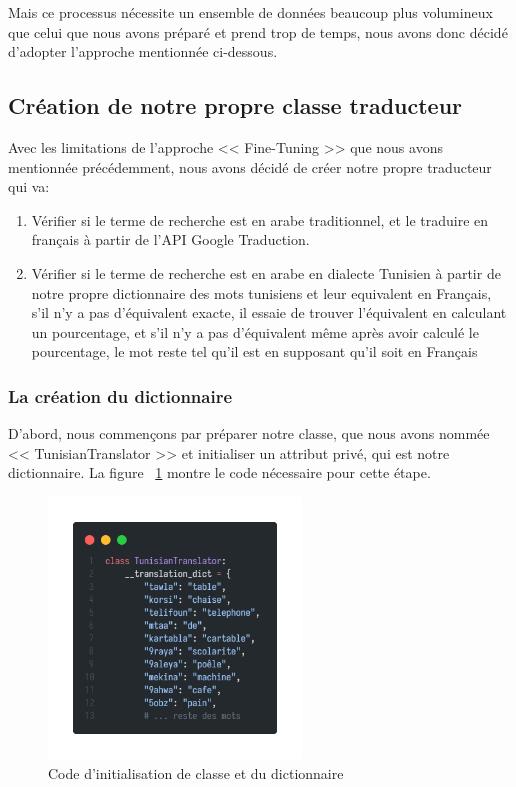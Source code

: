 \noindent
Mais ce processus nécessite un ensemble de données beaucoup plus volumineux que celui que nous avons préparé et prend trop de temps, nous avons donc décidé d'adopter l'approche mentionnée ci-dessous.

\newpage
\subsection{Création de notre propre classe traducteur}
\noindent
Avec les limitations de l'approche << Fine-Tuning >> que nous avons mentionnée précédemment, nous avons décidé de créer notre propre traducteur qui va:
\begin{enumerate}
	\item Vérifier si le terme de recherche est en arabe traditionnel, et le traduire en français à partir de l'API Google Traduction.
	\item Vérifier si le terme de recherche est en arabe en dialecte Tunisien à partir de notre propre dictionnaire des mots tunisiens et leur equivalent en Français, s'il n'y a pas d'équivalent exacte, il essaie de trouver l'équivalent en calculant un pourcentage, et s'il n'y a pas d'équivalent même après avoir calculé le pourcentage, le mot reste tel qu'il est en supposant qu'il soit en Français
\end{enumerate}

\subsubsection{La création du dictionnaire}
\noindent
D'abord, nous commençons par préparer notre classe, que nous avons nommée << TunisianTranslator >> et initialiser un attribut privé, qui est notre dictionnaire. La figure ~\ref{fig:dictionary} montre le code nécessaire pour cette étape.

\begin{figure}[H]
	\centering
	\includegraphics[width=0.6\textwidth]{logos/dictionary.png}
	\caption{Code d'initialisation de classe et du dictionnaire}
	\label{fig:dictionary}
\end{figure}

